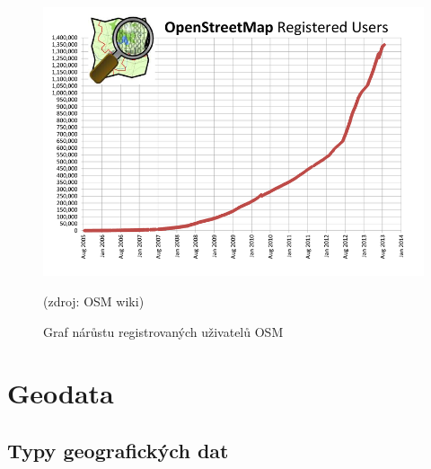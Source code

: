 \documentclass[11pt,a4paper,titlepage,oneside]{book}
\begin{document}
		\begin{figure}[!h]
			\begin{center}
				\includegraphics[width=12cm]{obrazky/osm_stat_users.png}
				\caption{Graf nárůstu registrovaných uživatelů \ac{OSM}}
				 (zdroj: \ac{OSM} wiki\cite{osm_wiki_stats})
			\end{center}
		\end{figure}


	\section{Geodata}
		\subsection{Typy geografických dat}




\end{document}
